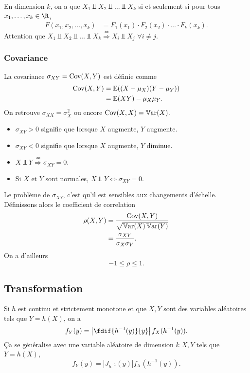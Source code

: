 En dimension $k$, on a que $X_1 \Perp X_2 \Perp \ldots \Perp X_k$
si et seulement si pour tous $x_1, \ldots, x_k \in \R$,
\begin{align*}
  F(x_1, x_2, \ldots, x_k) & = F_1(x_1) \cdot F_2(x_2) \cdot \ldots \cdot F_k(x_k).
\end{align*}
Attention que $X_1 \Perp X_2 \Perp \ldots \Perp X_k \stackrel{\nLeftarrow}{\Rightarrow} X_i \Perp X_j$ $\forall i \neq j$.

\subsubsection{Covariance}
La covariance $\sigma_{XY} = \operatorname{Cov}(X, Y)$ est définie comme
\begin{align*}
  \operatorname{Cov}(X, Y) & = \mathbb{E}((X-\mu_X)(Y-\mu_Y))\\
             & = \mathbb{E}(XY) - \mu_X \mu_Y.
\end{align*}
On retrouve $\sigma_{XX} = \sigma_{X}^2$ ou encore $\operatorname{Cov}(X,X) = \operatorname{\mathbb{V}ar}(X)$.
\begin{itemize}
  \item $\sigma_{XY} > 0$ signifie que lorsque $X$ augmente, $Y$ augmente.
  \item $\sigma_{XY} < 0$ signifie que lorsque $X$ augmente, $Y$ diminue.
  \item $X \Perp Y \stackrel{\nLeftarrow}{\Rightarrow} \sigma_{XY} = 0$.
  \item Si $X$ et $Y$ sont normales, $X \Perp Y \Leftrightarrow \sigma_{XY} = 0$.
\end{itemize}

Le problème de $\sigma_{XY}$, c'est qu'il est sensibles aux changements d'échelle.
Définissons alors le coefficient de correlation
\begin{align*}
  \rho(X, Y) & = \frac{\operatorname{Cov}(X,Y)}{\sqrt{\operatorname{\mathbb{V}ar}(X)\operatorname{\mathbb{V}ar}(Y)}}\\
             & = \frac{\sigma_{XY}}{\sigma_X \sigma_Y}.
\end{align*}
On a d'ailleurs
\[ -1 \leq \rho \leq 1. \]

\subsection{Transformation}
Si $h$ est continu et strictement monotone et que $X,Y$ sont des variables aléatoires tels que $Y = h(X)$,
on a
\[ f_Y(y) = \left|\fdif{h^{-1}(y)}{y}\right|f_X(h^{-1}(y)). \]
Ça se généralise avec une variable aléatoire de dimension $k$ $X, Y$ tels que $Y = h(X)$,
\[ f_Y(y) = \left|J_{h^{-1}}(y)\right|f_X(h^{-1}(y)). \]

